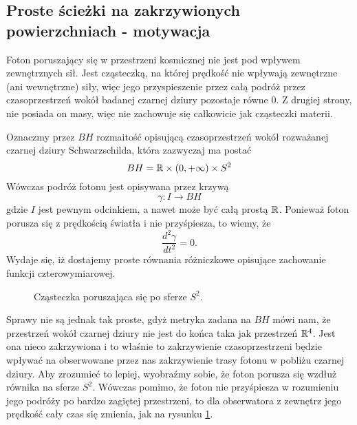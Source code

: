  \subsection{Proste ścieżki na zakrzywionych powierzchniach - motywacja}

Foton poruszający się w przestrzeni kosmicznej nie jest pod wpływem zewnętrznych sił. Jest cząsteczką, na której prędkość nie wpływają zewnętrzne (ani wewnętrzne) siły, więc jego przyspieszenie przez całą podróż przez czasoprzestrzeń wokół badanej czarnej dziury pozostaje równe $0$. Z drugiej strony, nie posiada on masy, więc nie zachowuje się całkowicie jak cząsteczki materii.

Oznaczmy przez $BH$ rozmaitość opisującą czasoprzestrzeń wokół rozważanej czarnej dziury Schwarzschilda, która zazwyczaj ma postać
$$ BH = \mathbb{R} \times (0,+\infty) \times S^2 $$
Wówczas podróż fotonu jest opisywana przez krzywą
$$ \gamma:I \to BH $$
gdzie $I$ jest pewnym odcinkiem, a nawet może być całą prostą $\mathbb{R}$. Ponieważ foton porusza się z prędkością światła i nie przyśpiesza, to wiemy, że 
$$\frac{d^2 \gamma} {d t^2}=0.$$ 
Wydaje się, iż dostajemy proste równania różniczkowe opisujące zachowanie funkcji czterowymiarowej.

\renewcommand{\figurename}{Rysunek}
\begin{figure}[h] 
  \centering 
  \vspace{1cm}
  \caption{Cząsteczka poruszająca się po sferze $S^2$.}\label{czasteczka po sferze}
  \vspace{1cm}
\end{figure}

Sprawy nie są jednak tak proste, gdyż metryka zadana na $BH$ mówi nam, że przestrzeń wokół czarnej dziury nie jest do końca taka jak przestrzeń $\mathbb{R}^4$. Jest ona nieco zakrzywiona i to właśnie to zakrzywienie czasoprzestrzeni będzie wpływać na obserwowane przez nas zakrzywienie trasy fotonu w pobliżu czarnej dziury. Aby zrozumieć to lepiej, wyobraźmy sobie, że foton porusza się wzdłuż równika na sferze $S^2$. Wówczas pomimo, że foton nie przyśpiesza w rozumieniu jego podróży po bardzo zagiętej przestrzeni, to dla obserwatora z zewnętrz jego prędkość cały czas się zmienia, jak na rysunku \ref{czasteczka po sferze}.

